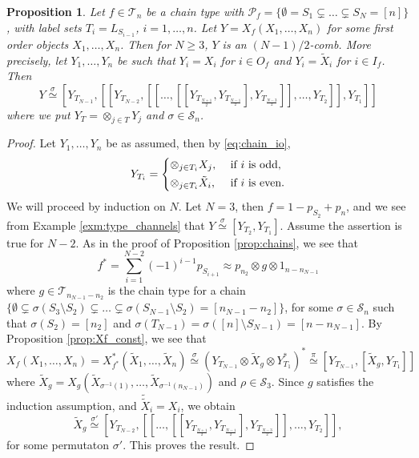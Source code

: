 \documentclass[12pt]{article}
\newtheorem{prop}{Proposition}
\theoremstyle{definition}
\theoremstyle{remark}
\def\Te{\mathcal T}
\def\Pe{\mathcal P}
\def\permut{\mathscr{S}}
\begin{document}
\begin{prop}\label{prop:chains_combs}  Let $f\in \Te_n$ be a chain type with
$\Pe_f=\{\emptyset=S_1\subsetneq\dots \subsetneq S_N=[n]\}$, with
label sets  $T_i=L_{S_{i-1}}$,  $i=1,\dots,n$.  Let $Y=X_f(X_1,\dots,X_n)$ for some first order objects $X_1,\dots, X_n$. 
Then for $N\ge 3$, $Y$ is an $(N-1)/2$-comb. 
More precisely, let $Y_1,\dots, Y_n$ be such that $Y_i=X_i$ for $i\in O_f$ and $Y_i=\tilde X_i$ for $i\in I_f$.
Then
\[
Y\overset{\sigma}{\simeq}
[Y_{T_{N-1}},[[Y_{T_{N-2}},[[\dots,[[Y_{T_{\frac{N+1}2}},Y_{T_{\frac{N-1}2}}],Y_{T_{\frac{N-3}2}}]],\dots,Y_{T_2}]],Y_{T_1}]] 
 \]
 where we put $Y_T=\otimes_{j\in T} Y_j$ and $\sigma\in \permut_n$.

\end{prop}



\begin{proof} Let $Y_1,\dots,Y_n$ be as assumed, then  by \eqref{eq:chain_io}, 
\[
Y_{T_i}=\begin{dcases} \otimes_{j\in T_i}X_j,  & \text{ if } i\text{ is odd},\\
\otimes_{j\in T_i}\tilde X_i,& \text{ if }i\text{ is even}.
\end{dcases}
\]
We will proceed by induction on $N$.
Let $N=3$, then $f=1-p_{S_2}+p_{n}$, and we see from Example \ref{exm:type_channels}
that  $Y\overset{\sigma}{\simeq} [Y_{T_2}, Y_{T_1}]$. 
Assume the assertion is true for  $N-2$.  As in the proof of Proposition \ref{prop:chains}, we see that 
\[
f^*=\sum_{i=1}^{N-2}(-1)^{i-1}p_{S_{i+1}}\approx p_{n_2}\otimes g\otimes 1_{n-n_{N-1}}
\]
where $g\in \Te_{n_{N-1}-n_2}$ is the chain type for  a chain $\{\emptyset\subsetneq
\sigma(S_3\setminus S_2)\subsetneq \dots\subsetneq \sigma(S_{N-1}\setminus
S_{2})=[n_{N-1}-n_2]\}$, for some $\sigma\in \permut_n$ such that $\sigma(S_2)=[n_2]$
and $\sigma(T_{N-1})=\sigma([n]\setminus S_{N-1})=[n-n_{N-1}]$. 
 By Proposition \ref{prop:Xf_const}, we see that 
\[
X_f(X_1,\dots,X_n)=X_{f^*}^*(\tilde X_1,\dots, \tilde X_n)\overset{\sigma}\simeq (Y_{T_{N-1}}\otimes
\tilde X_g\otimes Y^*_{T_1})^*\overset{\pi}{\simeq} [Y_{T_{N-1}},[\tilde X_g,Y_{T_1}]]
\]
where $\tilde X_g=X_g(\tilde X_{\sigma^{-1}(1)},\dots, \tilde X_{\sigma^{-1}(n_{N-1})})$
and $\rho\in \permut_3$. Since $g$ satisfies the induction assumption, and $\tilde {\tilde
X}_i=X_i$, we obtain 
\[
\tilde X_g\overset{\sigma'}{\simeq}
[Y_{T_{N-2}},[[\dots,[[Y_{T_{\frac{N+1}2}},Y_{T_{\frac{N-1}2}}],Y_{T_{\frac{N-3}2}}]],\dots,Y_{T_2}]],
\]
for some permutaton $\sigma'$. This proves the result.


\end{proof}
\end{document}
